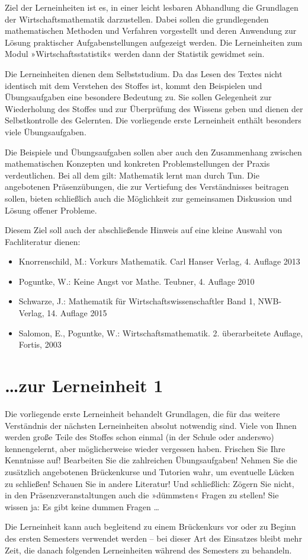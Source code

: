 Ziel der Lerneinheiten ist es, in einer leicht lesbaren Abhandlung die Grundlagen der Wirtschaftsmathematik darzustellen. Dabei sollen die grundlegenden mathematischen Methoden und Verfahren vorgestellt und deren Anwendung zur Lösung praktischer Aufgabenstellungen aufgezeigt werden. Die Lerneinheiten zum Modul »Wirtschaftsstatistik« werden dann der Statistik gewidmet sein.

Die Lerneinheiten dienen dem Selbststudium. Da das Lesen des Textes nicht identisch mit dem Verstehen des Stoffes ist, kommt den Beispielen und Übungsaufgaben eine besondere Bedeutung zu. Sie sollen Gelegenheit zur Wiederholung des Stoffes und zur Überprüfung des Wissens geben und dienen der Selbstkontrolle des Gelernten. Die vorliegende erste Lerneinheit enthält besonders viele Übungsaufgaben.

Die Beispiele und Übungsaufgaben sollen aber auch den Zusammenhang zwischen mathematischen Konzepten und konkreten Problemstellungen der Praxis verdeutlichen. Bei all dem gilt: Mathematik lernt man durch Tun. Die angebotenen Präsenzübungen, die zur Vertiefung des Verständnisses beitragen sollen, bieten schließlich auch die Möglichkeit zur gemeinsamen Diskussion und Lösung offener Probleme.

Diesem Ziel soll auch der abschließende Hinweis auf eine kleine Auswahl von Fachliteratur dienen:
\begin{itemize}
  \item Knorrenschild, M.: Vorkurs Mathematik. Carl Hanser Verlag, 4. Auflage 2013
  \item Poguntke, W.: Keine Angst vor Mathe. Teubner, 4. Auflage 2010
  \item Schwarze, J.: Mathematik für Wirtschaftswissenschaftler Band 1, NWB-Verlag, 14. Auflage 2015
  \item Salomon, E., Poguntke, W.: Wirtschaftsmathematik. 2. überarbeitete Auflage, Fortis, 2003
\end{itemize}

\chapter*{…zur Lerneinheit 1}

Die vorliegende erste Lerneinheit behandelt Grundlagen, die für das weitere Verständnis der nächsten Lerneinheiten absolut notwendig sind. Viele von Ihnen werden große Teile des Stoffes schon einmal (in der Schule oder anderswo) kennengelernt, aber möglicherweise wieder vergessen haben. Frischen Sie Ihre Kenntnisse auf! Bearbeiten Sie die zahlreichen Übungsaufgaben! Nehmen Sie die zusätzlich angebotenen Brückenkurse und Tutorien wahr, um eventuelle Lücken zu schließen! Schauen Sie in andere Literatur! Und schließlich: Zögern Sie nicht, in den Präsenzveranstaltungen auch die »dümmsten« Fragen zu stellen! Sie wissen ja: Es gibt keine dummen Fragen …

Die Lerneinheit kann auch begleitend zu einem Brückenkurs vor oder zu Beginn des ersten Semesters verwendet werden -- bei dieser Art des Einsatzes bleibt mehr Zeit, die danach folgenden Lerneinheiten während des Semesters zu behandeln.
